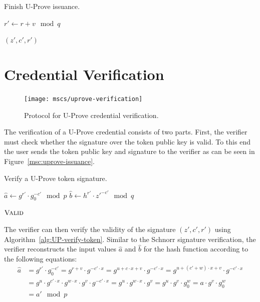 \begin{algorithm}
  \caption{Finish U-Prove issuance.}
  \label{alg:UP-issuance-finish}
  \addtolength{\baselineskip}{1mm}
  \begin{algorithmic}[1]
      \State $r' \gets r + v \mod q$

        \Return {}
      \EndIf

      \Return $(z', c', r')$
    \EndFunction
  \end{algorithmic}
\end{algorithm}

\section{Credential Verification}\label{sec:UP-verification}

\begin{figure}[ht]
  \centering
  \texttt{[image: mscs/uprove-verification]}
  \caption{Protocol for U-Prove credential verification.}
  \label{msc:uprove-verification}
\end{figure}

The verification of a U-Prove credential consists of two parts. First, the
verifier must check whether the signature over the token public key is valid. To
this end the user sends the token public key and signature to the verifier as
can be seen in Figure~\ref{msc:uprove-issuance}.
\begin{algorithm}
  \caption{Verify a U-Prove token signature.}
  \label{alg:UP-verify-token}
  \addtolength{\baselineskip}{1mm}
  \begin{algorithmic}[1]
      \State $\hat{a} \gets g^{r'} \cdot g_0^{-c'} \mod p$
      \State $\hat{b} \gets h^{r'} \cdot z'^{-c'} \mod q$
        \Return {}
      \EndIf

      \Return $\Call{Valid}{}$
    \EndFunction
  \end{algorithmic}
\end{algorithm}

The verifier can then verify the validity of the signature $(z', c', r')$ using
Algorithm~\ref{alg:UP-verify-token}. Similar to the Schnorr signature
verification, the verifier reconstructs the input values $\hat{a}$ and
$\hat{b}$ for the hash function according to the following equations:
\begin{align*}
  \hat{a}
  & = g^{r'} \cdot g_0^{-c'}
  = g^{r + v} \cdot g^{-c' \cdot x}
  = g^{u + c \cdot x + v} \cdot g^{-c' \cdot x}
  = g^{u + (c' + w) \cdot x + v} \cdot g^{-c' \cdot x} \\
  & = g^u \cdot g^{c' \cdot x} \cdot g^{w \cdot x} \cdot g^v \cdot g^{-c' \cdot x}
  = g^u \cdot g^{w \cdot x} \cdot g^v
  = g^u \cdot g^v \cdot g_0^w
  = a \cdot g^v \cdot g_0^w \\
  & = a' \mod p
\end{align*}

